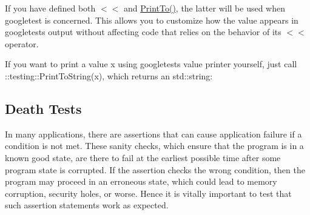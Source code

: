 \begin{DoxyCode}{0}
\DoxyCodeLine{}
\DoxyCodeLine{}
\DoxyCodeLine{  \}}
\DoxyCodeLine{\};}
\DoxyCodeLine{}
\DoxyCodeLine{\}}
\DoxyCodeLine{}
\end{DoxyCode}


If you have defined both {\ttfamily $<$$<$} and {\ttfamily \mbox{\hyperlink{namespacetesting_1_1internal_adb3c27150dbe661db0e0c4be27533460}{Print\+To()}}}, the latter will be used when googletest is concerned. This allows you to customize how the value appears in googletest\textquotesingle{}s output without affecting code that relies on the behavior of its {\ttfamily $<$$<$} operator.

If you want to print a value {\ttfamily x} using googletest\textquotesingle{}s value printer yourself, just call {\ttfamily \+::testing\+::\+Print\+To\+String(x)}, which returns an {\ttfamily std\+::string}\+:


\begin{DoxyCode}{0}
\DoxyCodeLine{}
\end{DoxyCode}


\subsection*{Death Tests}

In many applications, there are assertions that can cause application failure if a condition is not met. These sanity checks, which ensure that the program is in a known good state, are there to fail at the earliest possible time after some program state is corrupted. If the assertion checks the wrong condition, then the program may proceed in an erroneous state, which could lead to memory corruption, security holes, or worse. Hence it is vitally important to test that such assertion statements work as expected.

